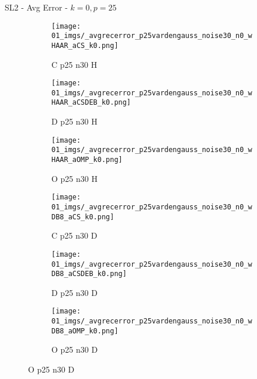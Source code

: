 \begin{frame}{SL2 - Avg Error - $k=0,p=25$}{}
\begin{figure}
\vspace{5pt}

\begin{subfigure}{0.13\textwidth}
\texttt{[image: 01\_imgs/\_avgrecerror\_p25vardengauss\_noise30\_n0\_wHAAR\_aCS\_k0.png]}
\caption*{\tiny C p25 n30 H}
\end{subfigure}
\begin{subfigure}{0.13\textwidth}
\texttt{[image: 01\_imgs/\_avgrecerror\_p25vardengauss\_noise30\_n0\_wHAAR\_aCSDEB\_k0.png]}
\caption*{\tiny D p25 n30 H}
\end{subfigure}
\begin{subfigure}{0.13\textwidth}
\texttt{[image: 01\_imgs/\_avgrecerror\_p25vardengauss\_noise30\_n0\_wHAAR\_aOMP\_k0.png]}
\caption*{\tiny O p25 n30 H}
\end{subfigure}
\begin{subfigure}{0.13\textwidth}
\texttt{[image: 01\_imgs/\_avgrecerror\_p25vardengauss\_noise30\_n0\_wDB8\_aCS\_k0.png]}
\caption*{\tiny C p25 n30 D}
\end{subfigure}
\begin{subfigure}{0.13\textwidth}
\texttt{[image: 01\_imgs/\_avgrecerror\_p25vardengauss\_noise30\_n0\_wDB8\_aCSDEB\_k0.png]}
\caption*{\tiny D p25 n30 D}
\end{subfigure}
\begin{subfigure}{0.13\textwidth}
\texttt{[image: 01\_imgs/\_avgrecerror\_p25vardengauss\_noise30\_n0\_wDB8\_aOMP\_k0.png]}
\caption*{\tiny O p25 n30 D}
\end{subfigure}
\end{figure}
\end{frame}


